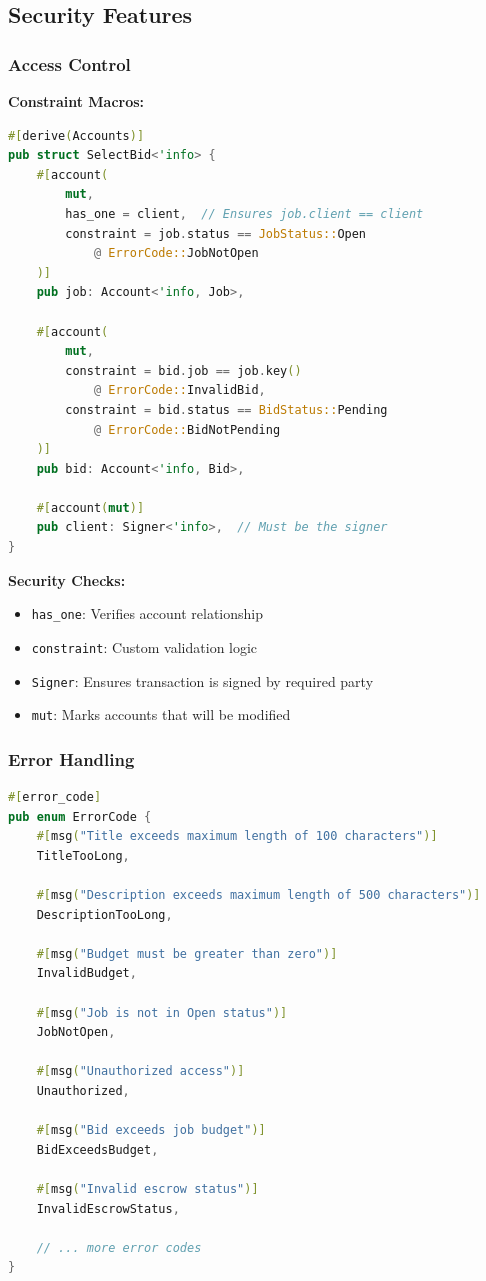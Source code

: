 \documentclass[a4paper,13pt,twoside]{report}
\theoremstyle{definition}
\begin{document}
\subsection{Security Features}

\subsubsection{Access Control}

\textbf{Constraint Macros:}
\begin{lstlisting}[language=Rust, caption=Access Control Constraints]
#[derive(Accounts)]
pub struct SelectBid<'info> {
    #[account(
        mut,
        has_one = client,  // Ensures job.client == client
        constraint = job.status == JobStatus::Open
            @ ErrorCode::JobNotOpen
    )]
    pub job: Account<'info, Job>,

    #[account(
        mut,
        constraint = bid.job == job.key()
            @ ErrorCode::InvalidBid,
        constraint = bid.status == BidStatus::Pending
            @ ErrorCode::BidNotPending
    )]
    pub bid: Account<'info, Bid>,

    #[account(mut)]
    pub client: Signer<'info>,  // Must be the signer
}
\end{lstlisting}

\textbf{Security Checks:}
\begin{itemize}
    \item \texttt{has\_one}: Verifies account relationship
    \item \texttt{constraint}: Custom validation logic
    \item \texttt{Signer}: Ensures transaction is signed by required party
    \item \texttt{mut}: Marks accounts that will be modified
\end{itemize}

\subsubsection{Error Handling}

\begin{lstlisting}[language=Rust, caption=Custom Error Codes]
#[error_code]
pub enum ErrorCode {
    #[msg("Title exceeds maximum length of 100 characters")]
    TitleTooLong,

    #[msg("Description exceeds maximum length of 500 characters")]
    DescriptionTooLong,

    #[msg("Budget must be greater than zero")]
    InvalidBudget,

    #[msg("Job is not in Open status")]
    JobNotOpen,

    #[msg("Unauthorized access")]
    Unauthorized,

    #[msg("Bid exceeds job budget")]
    BidExceedsBudget,

    #[msg("Invalid escrow status")]
    InvalidEscrowStatus,

    // ... more error codes
}
\end{lstlisting}
\end{document}
